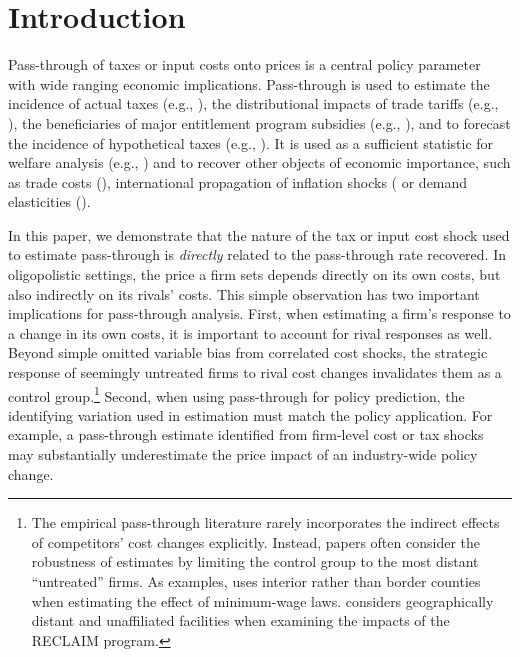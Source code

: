 \documentclass[12pt]{article}
\begin{document}
\clearpage

\section{Introduction}

Pass-through of taxes or input costs onto prices is a central policy parameter with wide ranging economic implications. Pass-through is used to estimate the incidence of actual taxes (e.g., \citet{marion_fuel_2011,fabra_pass-through_2014,stolper_who_2016}), the distributional impacts of trade tariffs (e.g., \citet{amiti2019impact,fajgelbaum2019return}), the beneficiaries of major entitlement program subsidies (e.g., \citet{duggan2016benefits}), and to forecast the incidence of hypothetical taxes (e.g., \citet{ganapati_incidence_2017}). It is used as a sufficient statistic for welfare analysis (e.g., \citet{chetty_sufficient_2009}) and to recover other objects of economic importance, such as trade costs (\citet{atkin_whos_2015}), international propagation of inflation shocks (\citet{gopinath2008sticky,auer2017international} or demand elasticities (\citet{miller_using_2013}).

In this paper, we demonstrate that the nature of the tax or input cost shock used to estimate pass-through is \emph{directly} related to the pass-through rate recovered. In oligopolistic settings, the price a firm sets depends directly on its own costs, but also indirectly on its rivals' costs. This simple observation has two important implications for pass-through analysis. First, when estimating a firm's response to a change in its own costs, it is important to account for rival responses as well. Beyond simple omitted variable bias from correlated cost shocks, the strategic response of seemingly untreated firms to rival cost changes invalidates them as a control group.\footnote{The empirical pass-through literature rarely incorporates the indirect effects of competitors' cost changes explicitly. Instead, papers often consider the robustness of estimates by limiting the control group to the most distant ``untreated'' firms. As examples, \citet{dube2010minimum} uses interior rather than border counties when estimating the effect of minimum-wage laws.  \citet{fowlie2012emissions} considers geographically distant and unaffiliated facilities when examining the impacts of the RECLAIM program.} Second, when using pass-through for policy prediction, the identifying variation used in estimation must match the policy application. For example, a pass-through estimate identified from firm-level cost or tax shocks may substantially underestimate the price impact of an industry-wide policy change.
\end{document}
